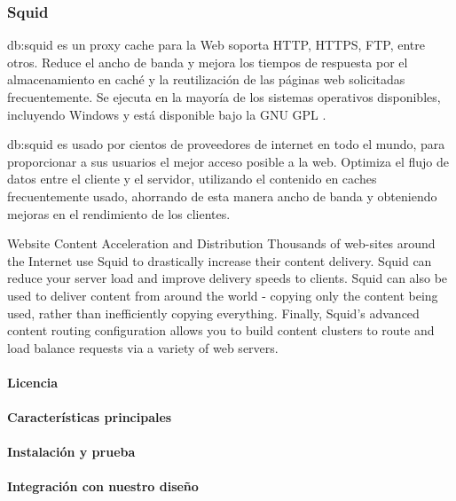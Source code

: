 \subsubsection{Squid}
\label{soa:tecnologias:squid}

\gls{db:squid} es un proxy cache para la Web soporta HTTP, HTTPS, FTP, entre otros. Reduce el ancho de banda y mejora los tiempos de respuesta por el almacenamiento en caché y la reutilización de las páginas web solicitadas frecuentemente.  Se ejecuta en la mayoría de los sistemas operativos disponibles, incluyendo Windows y está disponible bajo la GNU GPL .

\gls{db:squid} es usado por cientos de proveedores de internet en todo el mundo, para proporcionar a sus usuarios el mejor acceso posible a la web.  Optimiza el flujo de datos entre el cliente y el servidor, utilizando el contenido en caches frecuentemente usado, ahorrando de esta manera ancho de banda y obteniendo mejoras en el rendimiento de los clientes.


Website Content Acceleration and Distribution
Thousands of web-sites around the Internet use Squid to drastically increase their content delivery. Squid can reduce your server load and improve delivery speeds to clients. Squid can also be used to deliver content from around the world - copying only the content being used, rather than inefficiently copying everything. Finally, Squid's advanced content routing configuration allows you to build content clusters to route and load balance requests via a variety of web servers.

\paragraph{Licencia}

\paragraph{Características principales}

\paragraph{Instalación y prueba}

\paragraph{Integración con nuestro diseño}
